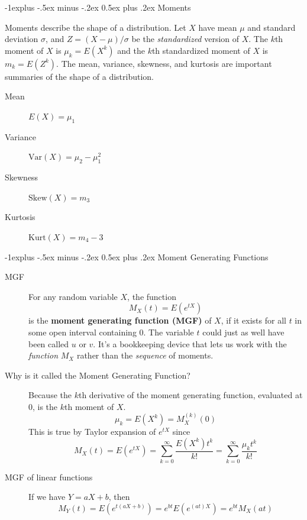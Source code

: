 \documentclass[6pt,landscape]{article}
\makeatletter
\newcommand{\var}{\textrm{Var}}
\renewcommand{\subsection}{\@startsection{subsection}{2}{0mm}%
                                {-1explus -.5ex minus -.2ex}%
                                {0.5ex plus .2ex}%
                                {\normalfont\normalsize\bfseries}}
\makeatother
\begin{document}
\begin{multicols*}{3}
\subsection{Moments}

Moments describe the shape of a distribution. Let $X$ have mean $\mu$ and standard deviation $\sigma$, and $Z=(X-\mu)/\sigma$ be the \emph{standardized} version of $X$. The $k$th moment of $X$ is $\mu_k = E(X^k)$ and the $k$th standardized moment of $X$ is $ m_k = E (Z^k)$.
The mean, variance,  skewness, and kurtosis are important summaries of the shape of a distribution.
    \begin{description}
        \item[Mean] $E(X) = \mu_1 $
        \item[Variance] $\var(X) = \mu_2 - \mu_1^2$
        \item[Skewness] $\textrm{Skew}(X) = m_3$
      \item[Kurtosis] $\textrm{Kurt}(X) = m_4 - 3$
    \end{description}

\subsection{Moment Generating Functions}

\begin{description}
    \item[MGF] For any random variable $X$, the function
        \[ M_X(t) = E(e^{tX}) \]
        is the \textbf{moment generating function (MGF)} of $X$, if it exists for all $t$ in some open interval containing $0$. The variable $t$ could just as well have been called $u$ or $v$. It's a bookkeeping device that lets us work with the \emph{function} $M_X$ rather than the \emph{sequence} of moments. 
                
            \item[Why is it called the Moment Generating Function?] Because the $k$th derivative of the moment generating function, evaluated at $0$, is the $k$th moment of $X$.
    \[\mu_k = E(X^k) = M_X^{(k)}(0)\]
    This is true by Taylor expansion of $e^{tX}$ since
    \[M_X(t) = E(e^{tX}) = \sum_{k=0}^\infty \frac{E(X^k)t^k}{k!} = \sum_{k=0}^\infty \frac{\mu_k t^k}{k!} \]

    \item[MGF of linear functions] If we have $Y = aX + b$, then
        \[M_Y(t) = E(e^{t(aX + b)}) =  e^{bt}E(e^{(at)X}) = e^{bt}M_X(at)\]
       

\end{description}
\end{multicols*}
\end{document}
